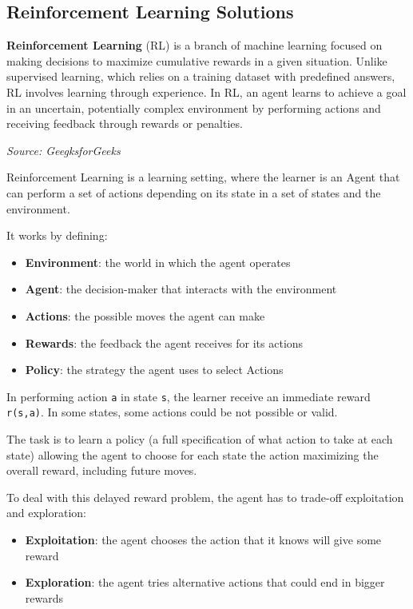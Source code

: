 \subsection{Reinforcement Learning Solutions}
\begin{blockquote}
  \textbf{Reinforcement Learning} (RL) is a branch of machine learning focused
  on making decisions to maximize cumulative rewards in a given situation. Unlike
  supervised learning, which relies on a training dataset with predefined
  answers, RL involves learning through experience. In RL, an agent learns to achieve
  a goal in an uncertain, potentially complex environment by performing actions
  and receiving feedback through rewards or penalties.

  \emph{Source: GeegksforGeeks \footnotemark}
\end{blockquote}

Reinforcement Learning is a learning setting, where the learner is an Agent that
can perform a set of actions depending on its state in a set of states and the environment.

It works by defining:
\begin{itemize}
  \item \textbf{Environment}: the world in which the agent operates

  \item \textbf{Agent}: the decision-maker that interacts with the environment

  \item \textbf{Actions}: the possible moves the agent can make

  \item \textbf{Rewards}: the feedback the agent receives for its actions

  \item \textbf{Policy}: the strategy the agent uses to select Actions
\end{itemize}

In performing action \texttt{a} in state \texttt{s}, the learner receive an
immediate reward \texttt{r(s,a)}. In some states, some actions could be not possible
or valid.

The task is to learn a policy (a full specification of what action to take at
each state) allowing the agent to choose for each state the action maximizing the
overall reward, including future moves.

To deal with this delayed reward problem, the agent has to trade-off exploitation
and exploration:
\begin{itemize}
  \item \textbf{Exploitation}: the agent chooses the action that it knows will give
    some reward

  \item \textbf{Exploration}: the agent tries alternative actions that could end
    in bigger rewards
\end{itemize}

